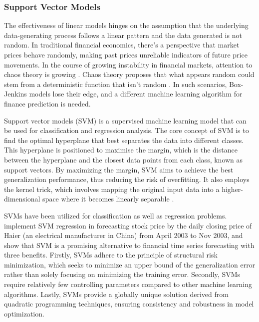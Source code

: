 \documentclass{article}
\begin{document}
\subsubsection{Support Vector Models}

The effectiveness of linear models hinges on the assumption that the underlying data-generating process follows a linear pattern and the data generated is not random. In traditional financial economics, there's a perspective that market prices behave randomly, making past prices unreliable indicators of future price movements. In the course of growing instability in financial markets, attention to chaos theory is growing \citep{klioutchnikov2017chaos, bao2004forecasting}. Chaos theory proposes that what appears random could stem from a deterministic function that isn't random \citep{chavas1993market}. In such scenarios, Box-Jenkins models lose their edge, and a different machine learning algorithm for finance prediction is needed.

Support vector models (SVM) is a supervised machine learning model that can be used for classification and regression analysis. The core concept of SVM is to find the optimal hyperplane that best separates the data into different classes. This hyperplane is positioned to maximise the margin, which is the distance between the hyperplane and the closest data points from each class, known as support vectors. By maximizing the margin, SVM aims to achieve the best generalization performance, thus reducing the risk of overfitting. It also employs the kernel trick, which involves mapping the original input data into a higher-dimensional space where it becomes linearly separable \cite{fletcher2009support}. 

SVMs have been utilized for classification as well as regression problems. \cite{bao2004forecasting} implement SVM regression in forecasting stock price by the daily closing price of Haier (an electrical manufacturer in China) from April 2003 to Nov 2003, and show that SVM is a promising alternative to financial time series forecasting with three benefits. Firstly, SVMs adhere to the principle of structural risk minimization, which seeks to minimize an upper bound of the generalization error rather than solely focusing on minimizing the training error. Secondly, SVMs require relatively few controlling parameters compared to other machine learning algorithms. Lastly, SVMs provide a globally unique solution derived from quadratic programming techniques, ensuring consistency and robustness in model optimization.
\end{document}
